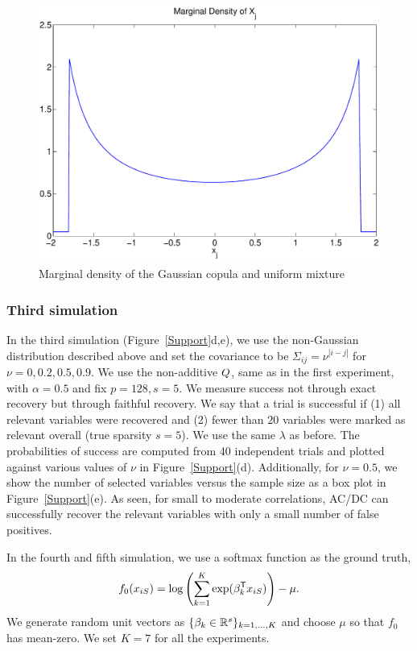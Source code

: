\begin{figure}
\includegraphics[width=.4\textwidth]{figs/copula_marginal}
\caption{Marginal density of the Gaussian copula and uniform mixture}
\label{fig:copula_marginal}
\end{figure}

\subsubsection{Third simulation}
In the \textrm{third simulation} (Figure~\ref{Support}d,e), we use the
non-Gaussian distribution described above and set the covariance
to be $\Sigma_{ij}=\nu^{|i-j|}$ for $\nu = 0, 0.2, 0.5, 0.9$. We use the
non-additive $Q$, same as in the first experiment, with $\alpha=0.5$
and fix $p=128, s=5$. We measure success not through exact recovery
but through faithful recovery. We say that a trial is successful if
(1) all relevant variables were recovered and (2) fewer than $20$
variables were marked as relevant overall (true sparsity $s=5$). We
use the same $\lambda$ as before. The probabilities of success are
computed from 40 independent trials and plotted against various values
of $\nu$ in Figure~\ref{Support}(d). Additionally, for $\nu = 0.5$, we
show the number of selected variables versus the sample size as a
box plot in Figure~\ref{Support}(e). As seen, for small to
moderate correlations, AC/DC can successfully recover the relevant
variables with only a small number of false positives.

In the fourth and fifth simulation, we use a softmax function as the ground truth,
\begin{align}
f_0(x_{iS}) = \log \left( \sum_{k=1}^K \exp( \beta_k^{\mathsf{T}} x_{iS} ) \right) - \mu.
\end{align}
We generate random unit vectors as $\{\beta_k \in {\mathbb R}^s\}_{k=1,\ldots,K}$ and choose $\mu$ so that $f_0$ has mean-zero. We set $K = 7$ for all the experiments. 

